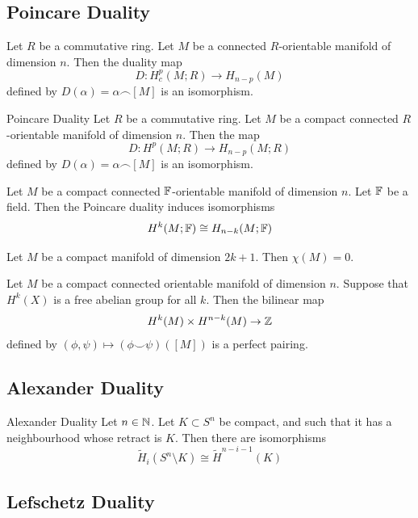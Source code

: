 \documentclass[a4paper]{article}
\begin{document}
\subsection{Poincare Duality}
\begin{prp}{}{} Let $R$ be a commutative ring. Let $M$ be a connected $R$-orientable manifold of dimension $n$. Then the duality map $$D:H_c^p(M;R)\to H_{n-p}(M)$$ defined by $D(\alpha)=\alpha\frown[M]$ is an isomorphism. 
\end{prp}

\begin{thm}{Poincare Duality}{} Let $R$ be a commutative ring. Let $M$ be a compact connected $R$-orientable manifold of dimension $n$. Then the map $$D:H^p(M;R)\to H_{n-p}(M;R)$$ defined by $D(\alpha)=\alpha\frown[M]$ is an isomorphism. 
\end{thm}

\begin{crl}{}{} Let $M$ be a compact connected $\mathbb{F}$-orientable manifold of dimension $n$. Let $\mathbb{F}$ be a field. Then the Poincare duality induces isomorphisms $$H^k(M;\mathbb{F})\cong H_{n-k}(M;\mathbb{F})$$
\end{crl}

\begin{prp}{}{} Let $M$ be a compact manifold of dimension $2k+1$. Then $\chi(M)=0$. 
\end{prp}

\begin{prp}{}{} Let $M$ be a compact connected orientable manifold of dimension $n$. Suppose that $H^k(X)$ is a free abelian group for all $k$. Then the bilinear map $$H^k(M)\times H^{n-k}(M)\to\mathbb{Z}$$ defined by $(\phi,\psi)\mapsto(\phi\smile\psi)([M])$ is a perfect pairing. 
\end{prp}

\subsection{Alexander Duality}
\begin{thm}{Alexander Duality}{} Let $n\in\mathbb{N}$. Let $K\subset S^n$ be compact, and such that it has a neighbourhood whose retract is $K$. Then there are isomorphisms $$\widetilde{H}_i(S^n\setminus K)\cong\widetilde{H}^{n-i-1}(K)$$
\end{thm}

\subsection{Lefschetz Duality}
\end{document}
